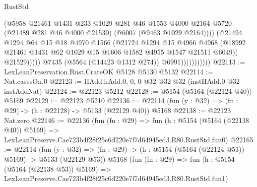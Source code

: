 \begin{lexlean}{RustStd}
\begin{coremodule}
                                    (@5958
                                      @21461
                                      @1431
                                      @233
                                      @1029
                                      @281
                                      @46
                                      @1553
                                      @4000
                                      @2164
                                      @5720
                                      (@21489 @281 @46 @4000 @21530)
                                      (@6007 (@9463 @1029 @2164))))
                                  (@21494
                                    @1294
                                    @64
                                    @15
                                    @18
                                    @4970
                                    @1566
                                    (@21724
                                      @1294
                                      @15
                                      @4966
                                      @4968
                                      (@18992
                                        @21461
                                        @1431
                                        @62
                                        @1029
                                        @15
                                        @1606
                                        @1582
                                        @4955
                                        @1547
                                        @21511
                                        @6049))
                                    @21529)))))
                          @7435
                          (@5564 (@14423 @1312 @274))
                          @6991)))))))))))
@22113 := LexLeanPreservation.Rust.CrateOK @5128 @5130 @5132
@22114 := Nat.casesOn.{0}
@22123 := HAdd.hAdd.{0, 0, 0} @32 @32 @32 (instHAdd.{0} @32 instAddNat)
@22124 := @22123 @5212
@22128 := @5154 (@5164 (@22124 @40)) @5169
@22129 := @22123 @5210
@22136 := @22114 (fun (y : @32) => (fn : @29) -> (h : @22128) -> @5133 (@22129 @40)) @5168
@22138 := @22123 Nat.zero
@22146 := @22136
    (fun (fn : @29) =>
    fun (h : @5154 (@5164 (@22138 @40)) @5169) =>
    LexLeanPreserve.Cae723b4f28f25c6d220e7f7d64945ed3.R80.RustStd.fun0)
@22165 := @22114
    (fun (y : @32) => (fn : @29) -> (h : @5154 (@5164 (@22124 @53)) @5169) -> @5133 (@22129 @53))
    @5168
    (fun (fn : @29) =>
    fun (h : @5154 (@5164 (@22138 @53)) @5169) =>
    LexLeanPreserve.Cae723b4f28f25c6d220e7f7d64945ed3.R80.RustStd.fun1)

\end{coremodule}
\end{lexlean}
